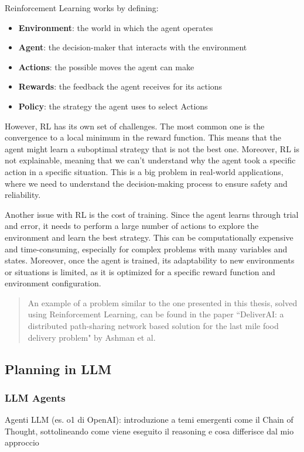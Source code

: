 Reinforcement Learning works by defining:
\begin{itemize}
  \item \textbf{Environment}: the world in which the agent operates

  \item \textbf{Agent}: the decision-maker that interacts with the environment

  \item \textbf{Actions}: the possible moves the agent can make

  \item \textbf{Rewards}: the feedback the agent receives for its actions

  \item \textbf{Policy}: the strategy the agent uses to select Actions
\end{itemize}

However, RL has its own set of challenges. The most common one is the
convergence to a local minimum in the reward function. This means that the agent
might learn a suboptimal strategy that is not the best one. Moreover, RL is not explainable,
meaning that we can't understand why the agent took a specific action in a
specific situation. This is a big problem in real-world applications, where we
need to understand the decision-making process to ensure safety and reliability.

Another issue with RL is the cost of training. Since the agent learns through trial
and error, it needs to perform a large number of actions to explore the
environment and learn the best strategy. This can be computationally expensive and
time-consuming, especially for complex problems with many variables and states. Moreover,
once the agent is trained, its adaptability to new environments or situations is
limited, as it is optimized for a specific reward function and environment
configuration.

\begin{quotation}
  An example of a problem similar to the one presented in this thesis, solved
  using Reinforcement Learning, can be found in the paper ``DeliverAI: a
  distributed path-sharing network based solution for the last mile food
  delivery problem" by Ashman et al.
\end{quotation}
\subsection{Planning in LLM}

\subsubsection{LLM Agents}
Agenti LLM (es. o1 di OpenAI): introduzione a temi emergenti come il Chain of Thought,
sottolineando come viene eseguito il reasoning e cosa differisce dal mio
approccio